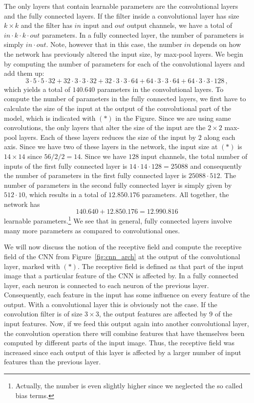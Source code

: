 The only layers that contain learnable parameters are the convolutional layers
and the fully connected layers. If the filter inside a convolutional layer has
size $k \times k$ and the filter has $in$ input and $out$ output channels, we
have a total of $in \cdot k \cdot k \cdot out$ parameters. In a fully connected
layer, the number of parameters is simply $in \cdot out$. Note, however that in
this case, the number $in$ depends on how the network has previously altered the
input size, \eg by max-pool layers. We begin by computing the number of
parameters for each of the convolutional layers and add them up:
\begin{equation*}
  3 \cdot 5 \cdot 5 \cdot 32 + 32 \cdot 3 \cdot 3 \cdot 32 + 32 \cdot 3 \cdot 3 \cdot 64 + 64 \cdot 3 \cdot 3 \cdot 64 + 64 \cdot 3 \cdot 3 \cdot 128\,,
\end{equation*}
which yields a total of $140.640$ parameters in the convolutional layers. To
compute the number of parameters in the fully connected layers, we first have to
calculate the size of the input at the output of the convolutional part of the
model, which is indicated with $(\ast)$ in the Figure. Since we are using same
convolutions, the only layers that alter the size of the input are the
$2 \times 2$ max-pool layers. Each of these layers reduces the size of the input
by $2$ along each axis. Since we have two of these layers in the network, the
input size at $(\ast)$ is $14 \times 14$ since $56 / 2 / 2 = 14$. Since we have
$128$ input channels, the total number of inputs of the first fully connected
layer is $14 \cdot 14 \cdot 128 = 25088$ and consequently the number of
parameters in the first fully connected layer is $25088 \cdot 512$. The number
of parameters in the second fully connected layer is simply given by
$512 \cdot 10$, which results in a total of $12.850.176$ parameters. All
together, the network has
\begin{equation*}
  140.640 + 12.850.176 = 12.990.816
\end{equation*}
learnable parameters.\footnote{Actually, the number is even slightly higher
  since we neglected the so called bias terms.} We see that in general, fully
connected layers involve many more parameters as compared to convolutional ones.

We will now discuss the notion of the receptive field and compute the receptive
field of the CNN from Figure~\ref{fig:cnn_arch} at the output of the
convolutional layer, marked with $(\ast)$. The receptive field is defined as
that part of the input image that a particular feature of the CNN is affected
by. In a fully connected layer, each neuron is connected to each neuron of the
previous layer. Consequently, each feature in the input has some influence on
every feature of the output. With a convolutional layer this is obviously not
the case. If the convolution filter is of size $3 \times 3$, the output features
are affected by $9$ of the input features. Now, if we feed this output again
into another convolutional layer, the convolution operation there will combine
features that have themselves been computed by different parts of the input
image. Thus, the receptive field was increased since each output of this layer
is affected by a larger number of input features than the previous layer.

